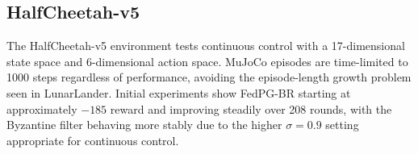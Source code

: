 \subsection{HalfCheetah-v5}

The HalfCheetah-v5 environment tests continuous control with a 17-dimensional
state space and 6-dimensional action space. MuJoCo episodes are time-limited
to 1000 steps regardless of performance, avoiding the episode-length growth
problem seen in LunarLander. Initial experiments show FedPG-BR starting at
approximately $-185$ reward and improving steadily over 208 rounds, with the
Byzantine filter behaving more stably due to the higher $\sigma = 0.9$ setting
appropriate for continuous control.
